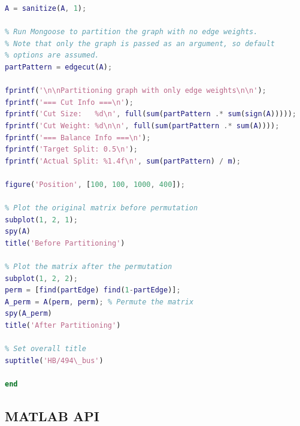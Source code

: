 \documentclass[letter]{article}
\begin{document}
\begin{lstlisting}[language=MATLAB]
% Remove edge weights
A = sanitize(A, 1);

% Run Mongoose to partition the graph with no edge weights.
% Note that only the graph is passed as an argument, so default
% options are assumed.
partPattern = edgecut(A);

fprintf('\n\nPartitioning graph with only edge weights\n\n');
fprintf('=== Cut Info ===\n');
fprintf('Cut Size:   %d\n', full(sum(partPattern .* sum(sign(A)))));
fprintf('Cut Weight: %d\n\n', full(sum(partPattern .* sum(A))));
fprintf('=== Balance Info ===\n');
fprintf('Target Split: 0.5\n');
fprintf('Actual Split: %1.4f\n', sum(partPattern) / m);

figure('Position', [100, 100, 1000, 400]);

% Plot the original matrix before permutation
subplot(1, 2, 1);
spy(A)
title('Before Partitioning')

% Plot the matrix after the permutation
subplot(1, 2, 2);
perm = [find(partEdge) find(1-partEdge)];
A_perm = A(perm, perm); % Permute the matrix
spy(A_perm)
title('After Partitioning')

% Set overall title
suptitle('HB/494\_bus')

end
\end{lstlisting}

\subsection{MATLAB API}
\end{document}
